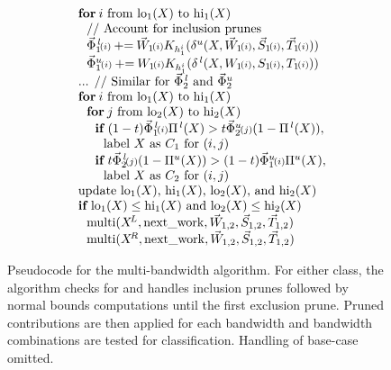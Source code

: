 \documentclass[twoside,leqno,twocolumn]{article}
\DeclareMathOperator{\multi}{multi}
\newcommand{\x}{\\~~}
\newcommand{\xx}{\\~~~~}
\newcommand{\xxx}{\\~~~~~~}
\newcommand{\xxxx}{\\~~~~~~~~}
\newcommand{\xif}{{\bf if}\:}
\newcommand{\xfor}{{\bf for}\:}
\newcommand{\peq}{\mathbin{\mathord{+}\mathord{=}}}
\newcommand{\kdleft}[1]{#1^{\!L}}
\newcommand{\kdright}[1]{#1^{\!R}}
\newcommand{\lo}[1]{#1^{\,l}}
\newcommand{\hi}[1]{#1^u}
\begin{document}
\begin{figure}[t]
\begin{center}
{\begin{minipage}{3.1in}
\begin{displaymath}
\begin{array}{l}
    \x \xfor i \text{ from } {\rm lo}_1(X) \text{ to } {\rm hi}_1(X)
    \xx \text{// Account for inclusion prunes}
    \xx \lo{\vec{\Phi}_1}{\scriptstyle \!(i)} \peq \vec{W}_1{\scriptstyle \!(i)} K_{h_1^i}(\hi{\delta}(X,\vec{W}_1{\scriptstyle \!(i)},\vec{S}_1{\scriptstyle \!(i)},\vec{T}_1{\scriptstyle \!(i)}))
    \xx \hi{\vec{\Phi}_1}{\scriptstyle \!(i)} \peq W_1{\scriptstyle \!(i)} K_{h_1^i}(\lo{\delta}(X,W_1{\scriptstyle \!(i)},S_1{\scriptstyle \!(i)},T_1{\scriptstyle \!(i)}))
    \x \text{... // Similar for $\lo{\vec{\Phi}_2}$ and $\hi{\vec{\Phi}_2}$}
    \x \xfor i \text{ from } {\rm lo}_1(X) \text{ to } {\rm hi}_1(X)
    \xx \xfor j \text{ from } {\rm lo}_2(X) \text{ to } {\rm hi}_2(X)
    \xxx \xif (1-t) \lo{\vec{\Phi}_1}{\scriptstyle \!(i)} \lo{\Pi}(X) > t \hi{\vec{\Phi}_2}{\scriptstyle \!(j)} (1 - \lo{\Pi}(X)),
    \xxxx \text{label $X$ as $C_1$ for $(i,j)$}
    \xxx \xif t \lo{\vec{\Phi}_2}{\scriptstyle \!(j)} (1 - \hi{\Pi}(X)) > (1-t) \hi{\vec{\Phi}_1}{\scriptstyle \!(i)} \hi{\Pi}(X),
    \xxxx \text{label $X$ as $C_2$ for $(i,j)$}
    \x \text{update ${\rm lo}_1(X)$, ${\rm hi}_1(X)$, ${\rm lo}_2(X)$, and ${\rm hi}_2(X)$}
    \x \xif {\rm lo}_1(X) \leq {\rm hi}_1(X) \text{ and } {\rm lo}_2(X) \leq {\rm hi}_2(X)
    \xx \multi(\kdleft{X},{\rm next\_work},\vec{W}_{1,2},\vec{S}_{1,2},\vec{T}_{1,2})
    \xx \multi(\kdright{X},{\rm next\_work},\vec{W}_{1,2},\vec{S}_{1,2},\vec{T}_{1,2})
  \end{array}\end{displaymath}
  \end{minipage}}\end{center}
  \vspace{-10pt}
  \caption{\label{fig:multi}\footnotesize Pseudocode for the
    multi-bandwidth algorithm.  For either class, the algorithm checks
    for and handles inclusion prunes followed by normal bounds
    computations until the first exclusion prune.  Pruned
    contributions are then applied for each bandwidth and bandwidth
    combinations are tested for classification.  Handling of base-case
    omitted.}
  \vspace{-120pt}
\end{figure}
\end{document}
